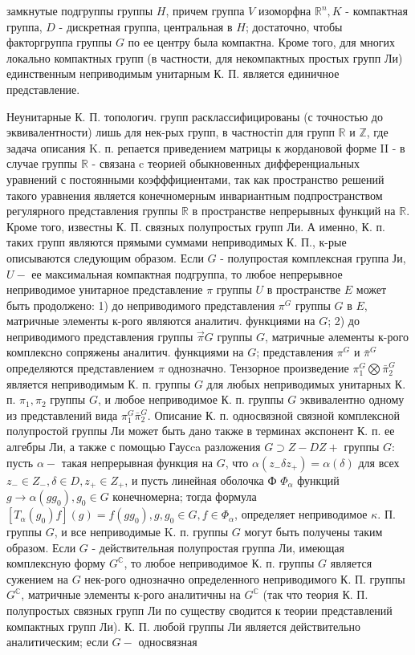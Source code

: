 \documentclass[10pt]{article}
\begin{document}
замкнутые подгруппы группы $H$, причем группа $V$ изоморфна $\mathbb{R}^{n}, K$ - компактная группа, $D$ - дискретная группа, центральная в $H$; достаточно, чтобы факторгруппа группы $G$ по ее центру была компактна. Кроме того, для многих локально компактных групп (в частности, для некомпактных простых групп Ли) единственным неприводимым унитарным К. П. является единичное представление.



Неунитарные К. П. топологич. групп расклассифицированы (с точностью до эквивалентности) лишь для нек-рых групп, в частностіп для групп $\mathbb{R}$ и $\mathbb{Z}$, где задача описания $\mathrm{K}$. п. репается приведением матрицы к жордановой форме II - в случае группы $\mathbb{R}$ - связана c теорией обыкновенных дифференциальных уравнений с постоянными коэфффициентами, так как пространство решений такого уравнения является конечномерным инвариантным подпространством регулярного представления группы $\mathbb{R}$ в пространстве непрерывных функций на $\mathbb{R}$. Кроме того, известны К. П. связных полупростых групп Ли. А именно, К. п. таких групп являются прямыми суммами неприводимых К. П., к-рые описываются следующим образом. Если $G$ - полупростая комплексная группа Ји, $U-$ ее максимальная компактная подгруппа, то любое непрерывное неприводимое унитарное представление $\pi$ группы $U$ в пространстве $E$ может быть продолжено: 1) до неприводимого представления $\pi^{G}$ группы $G$ в $E$, матричные элементы к-рого являются аналитич. функциями на $G$; 2) до неприводимого представления группы $\vec{\pi} G$ группы $G$, матричные әлементы к-рого комплексно сопряжены аналитич. функциями на $G$; представления $\pi^{G}$ и $\bar{\pi}^{G}$ определяются представлением $\pi$ однозначно. Тензорное произведение $\pi_{1}^{G} \bigotimes \bar{\pi}_{2}^{G}$ является неприводимым К. п. группы $G$ для любых неприводимых унитарных К. п. $\pi_{1}, \pi_{2}$ группы $G$, и любое неприводимое К. п. группы $G$ эквивалентно одному из представлений вида $\pi_{1}^{G} \bar{\pi}_{2}^{G}$. Описание К. п. односвязной связной комплексной полупростой группы Ли может быть дано также в терминах әкспонент К. п. ее алгебры Ли, а также с помощью Гаусca разложения $G \supset Z-D Z+$ группы $G:$ пусть $\alpha-$ такая непрерывная функция на $G$, что $\alpha\left(z_{-} \delta z_{+}\right)=\alpha(\delta)$ для всех $z_{-} \in Z_{-}, \delta \in D, z_{+} \in Z_{+}$, и пусть линейная оболочка Ф $\Phi_{\alpha}$ функций $g \rightarrow \alpha\left(g g_{0}\right), g_{0} \in G$ конечномерна; тогда формула $\left[T_{\alpha}\left(g_{0}\right) f\right](g)=f\left(g g_{0}\right), g, g_{0} \in G, f \in \Phi_{\alpha}$, определяет неприводимое $\kappa$. П. группы $G$, и все неприводимые K. п. группы $G$ могут быть получены таким образом. Если $G$ - действительная полупростая группа Ли, имеющая комплексную форму $G^{\mathbb{C}}$, то любое неприводимое К. п. группы $G$ является сужением на $G$ нек-рого однозначно определенного неприводимого К. П. группы $G^{\mathbb{C}}$, матричные элементы к-рого аналитичны на $G^{\mathbb{C}}$ (так что теория К. П. полупростых связных групп Ли по существу сводится к теории представлений компактных групп Ли). К. П. любой группы Ли является действительно аналитическим; если $G-$ односвязная 
\end{document}
